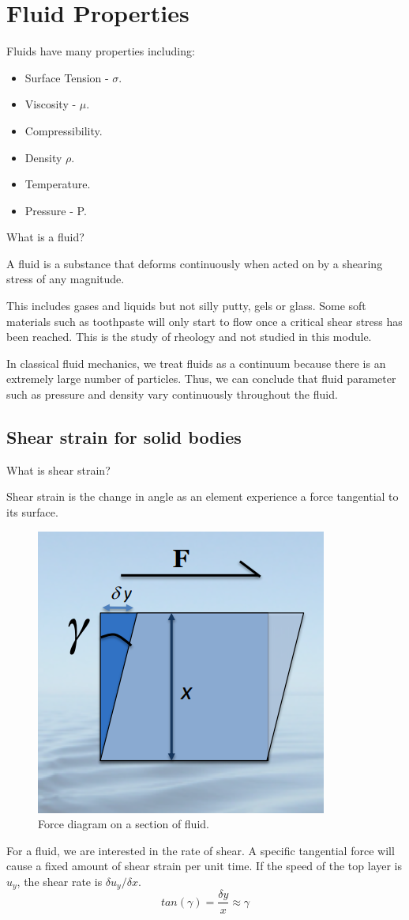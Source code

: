 \documentclass[class=report, crop=false, 12pt,a4paper]{standalone}
\numberwithin{equation}{section}
\begin{document}
\section{Fluid Properties}
Fluids have many properties including:
\begin{multicols}{2}
  \begin{itemize}[noitemsep]
    \item Surface Tension - \( \sigma \).
    \item Viscosity - \( \mu \).
    \item Compressibility.
    \item Density \( \rho \).
    \item Temperature.
    \item Pressure - P.
  \end{itemize}
\end{multicols}
What is a fluid?
\begin{center}
  A fluid is a substance that deforms continuously when acted on by a shearing stress of any magnitude. 
\end{center}
This includes gases and liquids but not silly putty, gels or glass. Some soft materials such as toothpaste will only start to flow once a critical shear stress has been reached. This is the study of rheology and not studied in this module.

In classical fluid mechanics, we treat fluids as a continuum because there is an extremely large number of particles. Thus, we can conclude that fluid parameter such as pressure and density vary continuously throughout the fluid.
\subsection{Shear strain for solid bodies}
What is shear strain?
\begin{center}
  Shear strain is the change in angle as an element experience a force tangential to its surface.
\end{center}
\begin{figure}[h!]
  \centering
  \includegraphics[width = 0.4 \textwidth]{../img/ShearStrainDiagram}
  \caption{Force diagram on a section of fluid.}
\end{figure}
For a fluid, we are interested in the rate of shear. A specific tangential force will cause a fixed amount of shear strain per unit time. If the speed of the top layer is \( u_y\), the shear rate is \(\delta u_y / \delta x\).
\begin{equation}
  tan(\gamma) = \frac{\delta y}{x} \approx \gamma
\end{equation}
\end{document}
